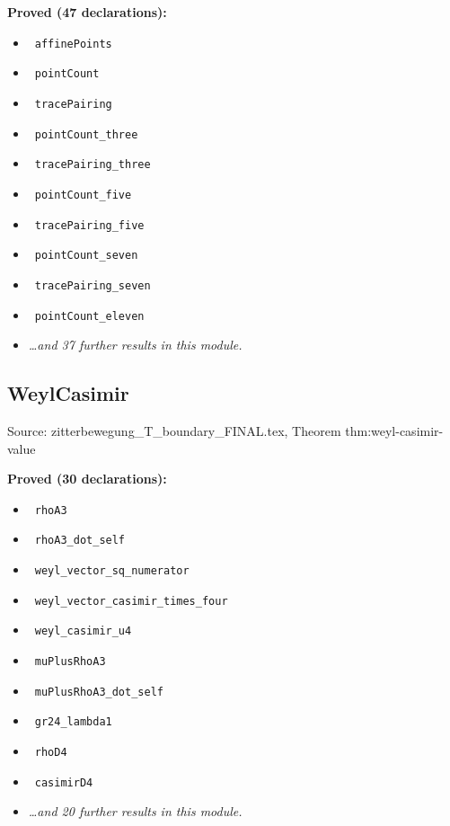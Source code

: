 \documentclass{report}
\theoremstyle{definition}
\begin{document}
\begin{itemize}
\begin{itemize}
\noindent\textbf{Proved (47 declarations):}
\begin{itemize}
  \item {}\leanok\ \texttt{affinePoints}
  \item {}\leanok\ \texttt{pointCount}
  \item {}\leanok\ \texttt{tracePairing}
  \item {}\leanok\ \texttt{pointCount\_three}
  \item {}\leanok\ \texttt{tracePairing\_three}
  \item {}\leanok\ \texttt{pointCount\_five}
  \item {}\leanok\ \texttt{tracePairing\_five}
  \item {}\leanok\ \texttt{pointCount\_seven}
  \item {}\leanok\ \texttt{tracePairing\_seven}
  \item {}\leanok\ \texttt{pointCount\_eleven}
  \item \emph{\ldots and 37 further results in this module.}
\end{itemize}

\subsection{WeylCasimir}
Source: zitterbewegung\_T\_boundary\_FINAL.tex, Theorem thm:weyl-casimir-value

\noindent\textbf{Proved (30 declarations):}
\begin{itemize}
  \item {}\leanok\ \texttt{rhoA3}
  \item {}\leanok\ \texttt{rhoA3\_dot\_self}
  \item {}\leanok\ \texttt{weyl\_vector\_sq\_numerator}
  \item {}\leanok\ \texttt{weyl\_vector\_casimir\_times\_four}
  \item {}\leanok\ \texttt{weyl\_casimir\_u4}
  \item {}\leanok\ \texttt{muPlusRhoA3}
  \item {}\leanok\ \texttt{muPlusRhoA3\_dot\_self}
  \item {}\leanok\ \texttt{gr24\_lambda1}
  \item {}\leanok\ \texttt{rhoD4}
  \item {}\leanok\ \texttt{casimirD4}
  \item \emph{\ldots and 20 further results in this module.}
\end{itemize}


\end{itemize}
\end{itemize}
\end{document}
